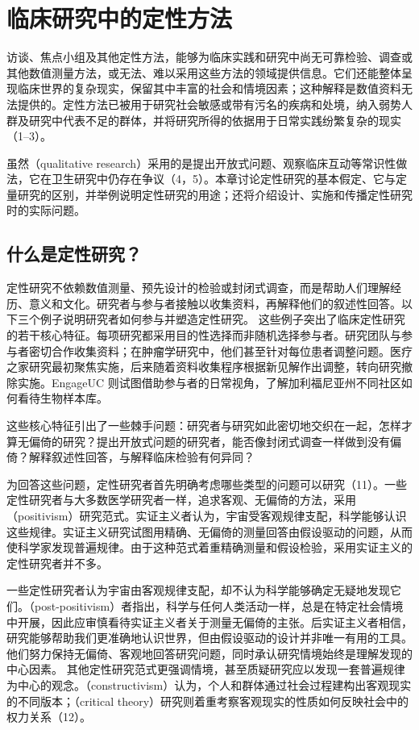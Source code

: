 \chapter{临床研究中的定性方法}
访谈、焦点小组及其他定性方法，能够为临床实践和研究中尚无可靠检验、调查或其他数值测量方法，或无法、难以采用这些方法的领域提供信息。它们还能整体呈现临床世界的复杂现实，保留其中丰富的社会和情境因素；这种解释是数值资料无法提供的。定性方法已被用于研究社会敏感或带有污名的疾病和处境，纳入弱势人群及研究中代表不足的群体，并将研究所得的依据用于日常实践纷繁复杂的现实（1--3）。

虽然（qualitative research）采用的是提出开放式问题、观察临床互动等常识性做法，它在卫生研究中仍存在争议（4，5）。本章讨论定性研究的基本假定、它与定量研究的区别，并举例说明定性研究的用途；还将介绍设计、实施和传播定性研究时的实际问题。

\section{什么是定性研究？}
定性研究不依赖数值测量、预先设计的检验或封闭式调查，而是帮助人们理解经历、意义和文化。研究者与参与者接触以收集资料，再解释他们的叙述性回答。以下三个例子说明研究者如何参与并塑造定性研究。
这些例子突出了临床定性研究的若干核心特征。每项研究都采用目的性选择而非随机选择参与者。研究团队与参与者密切合作收集资料；在肿瘤学研究中，他们甚至针对每位患者调整问题。医疗之家研究最初聚焦实施，后来随着资料收集程序根据新见解作出调整，转向研究撤除实施。EngageUC 则试图借助参与者的日常视角，了解加利福尼亚州不同社区如何看待生物样本库。

这些核心特征引出了一些棘手问题：研究者与研究如此密切地交织在一起，怎样才算无偏倚的研究？提出开放式问题的研究者，能否像封闭式调查一样做到没有偏倚？解释叙述性回答，与解释临床检验有何异同？

为回答这些问题，定性研究者首先明确考虑哪些类型的问题可以研究（11）。一些定性研究者与大多数医学研究者一样，追求客观、无偏倚的方法，采用（positivism）研究范式。实证主义者认为，宇宙受客观规律支配，科学能够认识这些规律。实证主义研究试图用精确、无偏倚的测量回答由假设驱动的问题，从而使科学家发现普遍规律。由于这种范式着重精确测量和假设检验，采用实证主义的定性研究者并不多。

一些定性研究者认为宇宙由客观规律支配，却不认为科学能够确定无疑地发现它们。（post-positivism）者指出，科学与任何人类活动一样，总是在特定社会情境中开展，因此应审慎看待实证主义者关于测量无偏倚的主张。后实证主义者相信，研究能够帮助我们更准确地认识世界，但由假设驱动的设计并非唯一有用的工具。他们努力保持无偏倚、客观地回答研究问题，同时承认研究情境始终是理解发现的中心因素。
其他定性研究范式更强调情境，甚至质疑研究应以发现一套普遍规律为中心的观念。（constructivism）认为，个人和群体通过社会过程建构出客观现实的不同版本；（critical theory）研究则着重考察客观现实的性质如何反映社会中的权力关系（12）。

